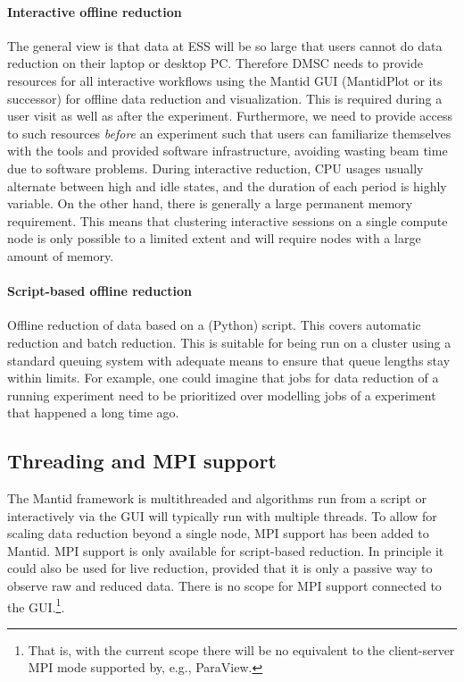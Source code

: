 \documentclass[a4paper,english,numbers=noenddot,bibliography=totoc,chapterprefix=on,DIV=12]{scrartcl}
\newcommand{\mantid}{Mantid\xspace}
\begin{document}
\paragraph{Interactive offline reduction}
The general view is that data at ESS will be so large that users cannot do data reduction on their laptop or desktop PC.
Therefore DMSC needs to provide resources for all interactive workflows using the \mantid GUI (MantidPlot or its successor) for offline data reduction and visualization.
This is required during a user visit as well as after the experiment.
Furthermore, we need to provide access to such resources \emph{before} an experiment such that users can familiarize themselves with the tools and provided software infrastructure, avoiding wasting beam time due to software problems.
During interactive reduction, CPU usages usually alternate between high and idle states, and the duration of each period is highly variable.
On the other hand, there is generally a large permanent memory requirement.
This means that clustering interactive sessions on a single compute node is only possible to a limited extent and will require nodes with a large amount of memory.

\paragraph{Script-based offline reduction}
Offline reduction of data based on a (Python) script.
This covers automatic reduction and batch reduction.
This is suitable for being run on a cluster using a standard queuing system with adequate means to ensure that queue lengths stay within limits.
For example, one could imagine that jobs for data reduction of a running experiment need to be prioritized over modelling jobs of a experiment that happened a long time ago.


\subsection{Threading and MPI support}
\label{sec:threading-and-mpi-support}

The \mantid framework is multithreaded and algorithms run from a script or interactively via the GUI will typically run with multiple threads.
To allow for scaling data reduction beyond a single node, MPI support has been added to \mantid.
MPI support is only available for script-based reduction.
In principle it could also be used for live reduction, provided that it is only a passive way to observe raw and reduced data.
There is no scope for MPI support connected to the GUI.\footnote{That is, with the current scope there will be no equivalent to the client-server MPI mode supported by, e.g., ParaView.}.
\end{document}
